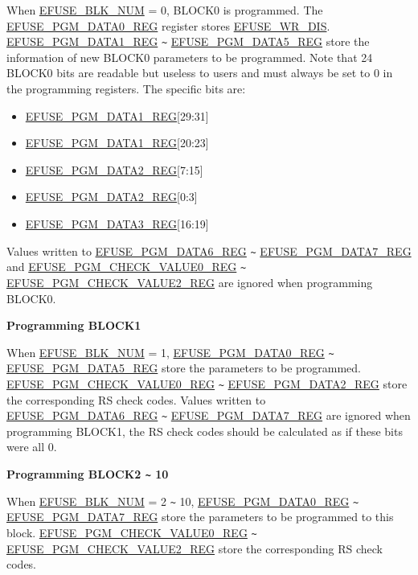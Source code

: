 \documentclass[main\_\_EN.tex]{subfiles}
\begin{document}
When \hyperref[fielddesc:EFUSEBLKNUM]{EFUSE\_BLK\_NUM} = 0, BLOCK0 is programmed. The \hyperref[regdesc:EFUSEPGMDATANREG]{EFUSE\_PGM\_DATA0\_REG} register stores \hyperref[fielddesc:EFUSEWRDIS]{EFUSE\_WR\_DIS}. \hyperref[regdesc:EFUSEPGMDATANREG]{EFUSE\_PGM\_DATA1\_REG} \verb+~+ \hyperref[regdesc:EFUSEPGMDATANREG]{EFUSE\_PGM\_DATA5\_REG} store the information of new BLOCK0 parameters to be programmed. Note that 24 BLOCK0 bits are readable but useless to users and must always be set to 0 in the programming registers. The specific bits are:

\begin{itemize}
    \item \hyperref[regdesc:EFUSEPGMDATANREG]{EFUSE\_PGM\_DATA1\_REG}[29:31]
    \item \hyperref[regdesc:EFUSEPGMDATANREG]{EFUSE\_PGM\_DATA1\_REG}[20:23]
    \item \hyperref[regdesc:EFUSEPGMDATANREG]{EFUSE\_PGM\_DATA2\_REG}[7:15]
    \item \hyperref[regdesc:EFUSEPGMDATANREG]{EFUSE\_PGM\_DATA2\_REG}[0:3]
    \item \hyperref[regdesc:EFUSEPGMDATANREG]{EFUSE\_PGM\_DATA3\_REG}[16:19]
\end{itemize}

Values written to \hyperref[regdesc:EFUSEPGMDATANREG]{EFUSE\_PGM\_DATA6\_REG} \verb+~+ \hyperref[regdesc:EFUSEPGMDATANREG]{EFUSE\_PGM\_DATA7\_REG} and \hyperref[regdesc:EFUSEPGMCHECKVALUENREG]{EFUSE\_PGM\_CHECK\_VALUE0\_REG} \verb+~+ \hyperref[regdesc:EFUSEPGMCHECKVALUENREG]{EFUSE\_PGM\_CHECK\_VALUE2\_REG} are ignored when programming BLOCK0.

{\bfseries Programming BLOCK1}

When \hyperref[fielddesc:EFUSEBLKNUM]{EFUSE\_BLK\_NUM} = 1, \hyperref[regdesc:EFUSEPGMDATANREG]{EFUSE\_PGM\_DATA0\_REG} \verb+~+ \hyperref[regdesc:EFUSEPGMDATANREG]{EFUSE\_PGM\_DATA5\_REG} store the parameters to be programmed. \hyperref[regdesc:EFUSEPGMCHECKVALUENREG]{EFUSE\_PGM\_CHECK\_VALUE0\_REG} \verb+~+ \hyperref[regdesc:EFUSEPGMDATANREG]{EFUSE\_PGM\_DATA2\_REG} store the corresponding RS check codes. Values written to \hyperref[regdesc:EFUSEPGMDATANREG]{EFUSE\_PGM\_DATA6\_REG} \verb+~+ \hyperref[regdesc:EFUSEPGMDATANREG]{EFUSE\_PGM\_DATA7\_REG} are ignored when programming BLOCK1, the RS check codes should be calculated as if these bits were all 0.

{\bfseries Programming BLOCK2 \verb+~+ 10}

When \hyperref[fielddesc:EFUSEBLKNUM]{EFUSE\_BLK\_NUM} = 2 \verb+~+ 10, \hyperref[regdesc:EFUSEPGMDATANREG]{EFUSE\_PGM\_DATA0\_REG} \verb+~+ \hyperref[regdesc:EFUSEPGMDATANREG]{EFUSE\_PGM\_DATA7\_REG} store the parameters to be programmed to this block. \hyperref[regdesc:EFUSEPGMCHECKVALUENREG]{EFUSE\_PGM\_CHECK\_VALUE0\_REG} \verb+~+ \hyperref[regdesc:EFUSEPGMCHECKVALUENREG]{EFUSE\_PGM\_CHECK\_VALUE2\_REG} store the corresponding RS check codes.
\end{document}
